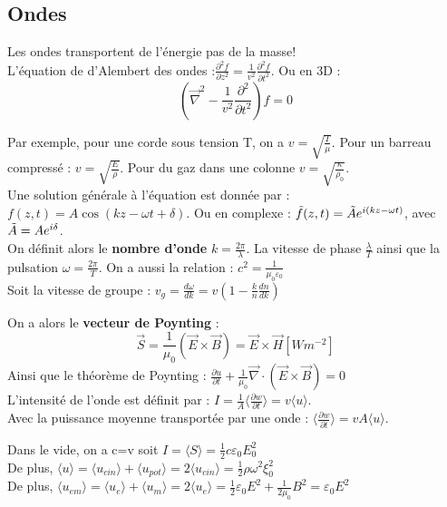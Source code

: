 \documentclass[../main.tex]{subfiles}
\begin{document}
\subsection{Ondes}
Les ondes transportent de l'énergie pas de la masse!\\
L'équation de d'Alembert des ondes :$\frac{\partial^2 f}{\partial z^2} = \frac{1}{v^2} \frac{\partial^2f}{\partial t^2}$. Ou en 3D :\\

\begin{equation}
(\vec{\nabla}^2 - \frac{1}{v^2}\frac{\partial^2}{\partial t^2})f = 0
\end{equation}

Par exemple, pour une corde sous tension T, on a $v=\sqrt{\frac{T}{\mu}}$. Pour un barreau compressé : $v = \sqrt{\frac{E}{\rho}}$. Pour du gaz dans une colonne $v=\sqrt{\frac{\kappa}{\rho_0}}$.\\

Une solution générale à l'équation est donnée par : $f(z,t) = A\cos{(kz-\omega t + \delta)}$. Ou en complexe : $\Tilde{f}(z,t) = \Tilde{A}e^{i(kz-\omega t)}$, avec $\Tilde{A} = A e^{i\delta}$.\\

On définit alors le \textbf{nombre d'onde} $k = \frac{2\pi}{\lambda}$. La vitesse de phase $\frac{\lambda}{T}$ ainsi que la pulsation $\omega = \frac{2\pi}{T}$. On a aussi la relation : $c^2 = \frac{1}{\mu_0 \varepsilon_0}$\\

Soit la vitesse de groupe : $v_g = \frac{d\omega}{dk} = v(1-\frac{k}{n} \frac{dn}{dk})$

On a alors le \textbf{vecteur de Poynting} : \\
\begin{equation}
    \vec{S} =  \frac{1}{\mu_0} (\vec{E} \times \vec{B}) = \vec{E} \times \vec{H} [Wm^{-2}]
\end{equation}
Ainsi que le théorème de Poynting : $\frac{\partial u}{\partial t} + \frac{1}{\mu_0} \vec{\nabla} \cdot (\vec{E}\times \vec{B}) = 0$\\


L'intensité de l'onde est définit par : $I = \frac{1}{A} \langle \frac{\partial w}{\partial t} \rangle= v\langle u\rangle$.\\
Avec la puissance moyenne transportée par une onde : $\langle \frac{\partial w}{\partial t}\rangle = vA \langle u \rangle$. 

Dans le vide, on a c=v soit $I = \langle S\rangle = \frac{1}{2}c\varepsilon_0 E_0^2$\\
De plus, $\langle u \rangle = \langle u_{cin} \rangle + \langle u_{pot} \rangle = 2\langle u_{cin}\rangle = \frac{1}{2}\rho \omega^2 \xi_0^2$\\
De plus, $\langle u_{em} \rangle = \langle u_e\rangle + \langle u_m\rangle = 2\langle u_e\rangle = \frac{1}{2}\varepsilon_0E^2 + \frac{1}{2\mu_0}B^2 = \varepsilon_0 E^2$\\
\end{document}
